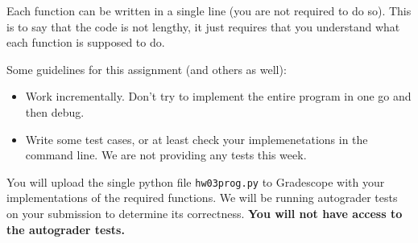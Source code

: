 \documentclass{article}
\theoremstyle{remark}
\begin{document}
Each function can be written in a single line (you are not required to do so).
This is to say that the code is not lengthy, it just requires that you understand what each function is supposed to do.

Some guidelines for this assignment (and others as well):
\begin{itemize}
\item Work incrementally. Don't try to implement the entire program in one go and then debug.
\item Write some test cases, or at least check your implemenetations in the command line.
  We are not providing any tests this week.
\end{itemize}

You will upload the single python file \texttt{hw03prog.py} to Gradescope with your implementations of the required functions.
We will be running autograder tests on your submission to determine its correctness.
\textbf{You will not have access to the autograder tests.}
\end{document}
